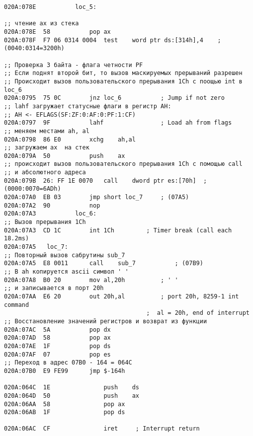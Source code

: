 \begin{lstlisting}[style={asm}]
020A:078E			loc_5:

;; чтение ax из стека
020A:078E  58			pop	ax
020A:078F  F7 06 0314 0004	test	word ptr ds:[314h],4	; (0040:0314=3200h)

;; Проверка 3 байта - флага четности PF
;; Если поднят второй бит, то вызов маскируемых прерываний разрешен
;; Происходит вызов пользовательского прерывания 1Ch с поощью int в loc_6
020A:0795  75 0C		jnz	loc_6			; Jump if not zero
;; lahf загружает статусные флаги в регистр AH: 
;; AH <- EFLAGS(SF:ZF:0:AF:0:PF:1:CF)
020A:0797  9F			lahf				; Load ah from flags
;; меняем местами ah, al
020A:0798  86 E0		xchg	ah,al
;; загружаем ax  на стек
020A:079A  50			push	ax
;; происходит вызов пользовательского прерывания 1Ch с помощью call 
;; и абсолютного адреса
020A:079B  26: FF 1E 0070	call	dword ptr es:[70h]	; (0000:0070=6ADh)
020A:07A0  EB 03		jmp	short loc_7		; (07A5)
020A:07A2  90			nop
020A:07A3			loc_6:
;; Вызов прерывания 1Ch
020A:07A3  CD 1C		int	1Ch			; Timer break (call each 18.2ms)
020A:07A5	loc_7:
;; Повторный вызов сабрутины sub_7
020A:07A5  E8 0011		call	sub_7			; (07B9)
;; В ah копируется ascii символ ' '
020A:07A8  B0 20		mov	al,20h			; ' '
;; и записывается в порт 20h
020A:07AA  E6 20		out	20h,al			; port 20h, 8259-1 int command
										;  al = 20h, end of interrupt
;; Восстановление значений регистров и возврат из функции
020A:07AC  5A			pop	dx
020A:07AD  58			pop	ax
020A:07AE  1F			pop	ds
020A:07AF  07			pop	es
;; Переход в адрес 07B0 - 164 = 064C
020A:07B0  E9 FE99		jmp	$-164h

020A:064C  1E				push	ds
020A:064D  50				push	ax
020A:06AA  58				pop	ax
020A:06AB  1F				pop	ds

020A:06AC  CF				iret	 ; Interrupt return

\end{lstlisting}

